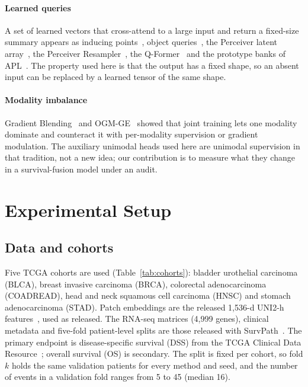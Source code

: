 \documentclass{article}
\begin{document}
\paragraph{Learned queries} A set of learned vectors that cross-attend to a large input and return a fixed-size summary appears as inducing points~\citep{lee2019set}, object queries~\citep{carion2020detr}, the Perceiver latent array~\citep{jaegle2021perceiver}, the Perceiver Resampler~\citep{alayrac2022flamingo}, the Q-Former~\citep{li2023blip2} and the prototype banks of APL~\citep{liu2025apl}. The property used here is that the output has a fixed shape, so an absent input can be replaced by a learned tensor of the same shape.

\paragraph{Modality imbalance} Gradient Blending~\citep{wang2020gradientblending} and OGM-GE~\citep{peng2022ogmge} showed that joint training lets one modality dominate and counteract it with per-modality supervision or gradient modulation. The auxiliary unimodal heads used here are unimodal supervision in that tradition, not a new idea; our contribution is to measure what they change in a survival-fusion model under an audit.

\section{Experimental Setup}
\label{sec:setup}

\subsection{Data and cohorts}
Five TCGA cohorts are used (Table~\ref{tab:cohorts}): bladder urothelial carcinoma (BLCA), breast invasive carcinoma (BRCA), colorectal adenocarcinoma (COADREAD), head and neck squamous cell carcinoma (HNSC) and stomach adenocarcinoma (STAD). Patch embeddings are the released 1,536-d UNI2-h features~\citep{chen2024uni,uni2h,uni2hfeatures}, used as released. The RNA-seq matrices (4,999 genes), clinical metadata and five-fold patient-level splits are those released with SurvPath~\citep{jaume2024survpath}. The primary endpoint is disease-specific survival (DSS) from the TCGA Clinical Data Resource~\citep{liu2018integrated}; overall survival (OS) is secondary. The split is fixed per cohort, so fold $k$ holds the same validation patients for every method and seed, and the number of events in a validation fold ranges from 5 to 45 (median 16).
\end{document}
